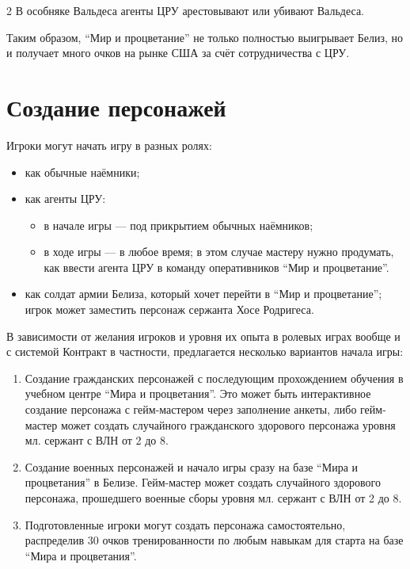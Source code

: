 \documentclass[twoside]{article}
\begin{document}
\begin{multicols}{2}
В особняке Вальдеса агенты ЦРУ арестовывают или убивают Вальдеса.

Таким образом, \enquote{Мир и процветание} не только полностью выигрывает Белиз,
но и получает много очков на рынке США за счёт сотрудничества с ЦРУ.

\section{Создание персонажей}\label{char-creation}

Игроки могут начать игру в разных ролях:

\begin{itemize}
\item
  как обычные наёмники;
\item
  как агенты ЦРУ:

  \begin{itemize}
  \item
    в начале игры --- под прикрытием обычных наёмников;
  \item
    в ходе игры --- в любое время; в этом случае мастеру нужно продумать,
    как ввести агента ЦРУ в команду оперативников \enquote{Мир и процветание}.
  \end{itemize}
\item
  как солдат армии Белиза, который хочет перейти в \enquote{Мир и процветание};
  игрок может заместить персонаж сержанта Хосе Родригеса.
\end{itemize}

В зависимости от желания игроков и уровня их опыта в ролевых играх
вообще и с системой Контракт в частности, предлагается несколько
вариантов начала игры:

\begin{enumerate}
\def\labelenumi{\arabic{enumi}.}
\item
  Создание гражданских персонажей с последующим прохождением обучения в
  учебном центре \enquote{Мира и процветания}. Это может быть интерактивное
  создание персонажа с гейм-мастером через заполнение анкеты, либо
  гейм-мастер может создать случайного гражданского здорового персонажа
  уровня мл. сержант с ВЛН от 2 до 8.
\item
  Создание военных персонажей и начало игры сразу на базе \enquote{Мира и
  процветания} в Белизе. Гейм-мастер может создать случайного здорового
  персонажа, прошедшего военные сборы уровня мл. сержант с ВЛН от 2 до
  8.
\item
  Подготовленные игроки могут создать персонажа самостоятельно,
  распределив 30 очков тренированности по любым навыкам для старта на
  базе \enquote{Мира и процветания}.
\end{enumerate}


\end{multicols}
\end{document}
